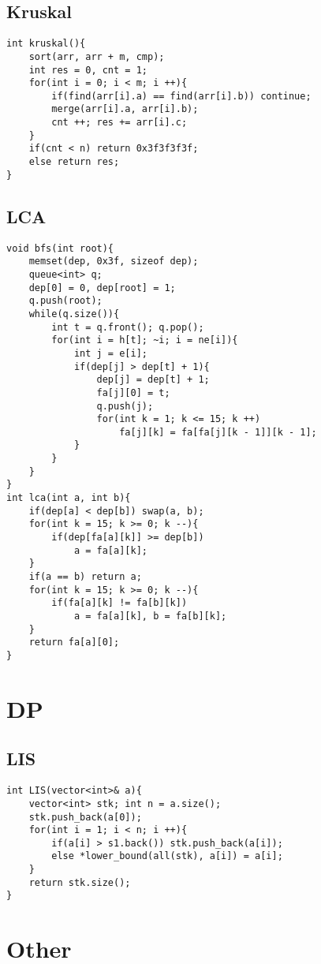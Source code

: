 \documentclass[twocolumn,a4]{article}
\begin{document}
\subsection{Kruskal}
\begin{lstlisting}
int kruskal(){
    sort(arr, arr + m, cmp);
    int res = 0, cnt = 1;
    for(int i = 0; i < m; i ++){
        if(find(arr[i].a) == find(arr[i].b)) continue;
        merge(arr[i].a, arr[i].b); 
        cnt ++; res += arr[i].c;
    }
    if(cnt < n) return 0x3f3f3f3f;
    else return res;
}
\end{lstlisting}

\subsection{LCA}
\begin{lstlisting}
void bfs(int root){
    memset(dep, 0x3f, sizeof dep);
    queue<int> q;
    dep[0] = 0, dep[root] = 1;
    q.push(root);
    while(q.size()){
        int t = q.front(); q.pop();
        for(int i = h[t]; ~i; i = ne[i]){
            int j = e[i];
            if(dep[j] > dep[t] + 1){
                dep[j] = dep[t] + 1; 
                fa[j][0] = t;
                q.push(j);
                for(int k = 1; k <= 15; k ++)
                    fa[j][k] = fa[fa[j][k - 1]][k - 1]; 
            }
        }
    }
}
int lca(int a, int b){
    if(dep[a] < dep[b]) swap(a, b);
    for(int k = 15; k >= 0; k --){
        if(dep[fa[a][k]] >= dep[b])
            a = fa[a][k];
    }
    if(a == b) return a;
    for(int k = 15; k >= 0; k --){
        if(fa[a][k] != fa[b][k])
            a = fa[a][k], b = fa[b][k];
    }
    return fa[a][0];
}
\end{lstlisting}

\section{DP}
\subsection{LIS}
\begin{lstlisting}
int LIS(vector<int>& a){
    vector<int> stk; int n = a.size();
    stk.push_back(a[0]);
    for(int i = 1; i < n; i ++){
        if(a[i] > s1.back()) stk.push_back(a[i]);
        else *lower_bound(all(stk), a[i]) = a[i];
    }
    return stk.size();
}
\end{lstlisting}


\section{Other}
\end{document}
